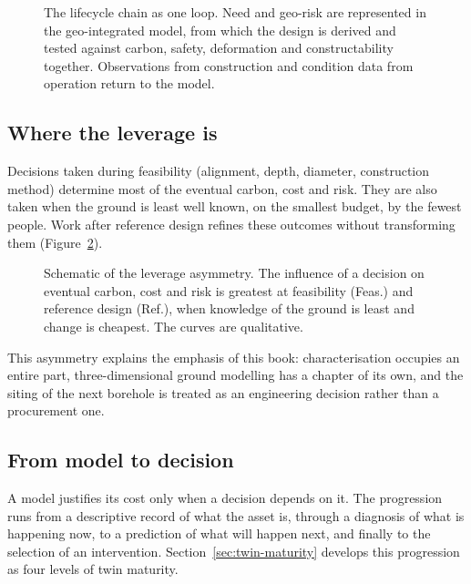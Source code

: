 \begin{figure}[htbp]
\centering
{}
\caption{The lifecycle chain as one loop. Need and geo-risk are represented in
the geo-integrated model, from which the design is derived and tested against
carbon, safety, deformation and constructability together. Observations from
construction and condition data from operation return to the model.}
\label{fig:chal-lifecycle-loop}
\end{figure}

\subsection{Where the leverage is}
\label{sec:leverage}

Decisions taken during feasibility (alignment, depth, diameter,
construction method) determine most of the eventual carbon, cost and risk.
They are also taken when the ground is least well known, on the smallest
budget, by the fewest people. Work after reference design refines these
outcomes without transforming them (Figure~\ref{fig:chal-leverage}).

\begin{figure}[htbp]
\centering
{}
\caption{Schematic of the leverage asymmetry. The influence of a decision on
eventual carbon, cost and risk is greatest at feasibility (Feas.) and
reference design (Ref.), when knowledge of the ground is least and change is
cheapest. The curves are qualitative.}
\label{fig:chal-leverage}
\end{figure}

This asymmetry explains the emphasis of this book:
characterisation occupies an entire part, three-dimensional ground
modelling has a chapter of its own, and the siting of the next
borehole is treated as an engineering decision rather than a
procurement one.

\subsection{From model to decision}
\label{sec:model-to-decision}

A model justifies its cost only when a decision depends on it. The progression
runs from a descriptive record of what the asset is, through a diagnosis of
what is happening now, to a prediction of what will happen next, and finally
to the selection of an intervention. Section~\ref{sec:twin-maturity} develops
this progression as four levels of twin maturity.

